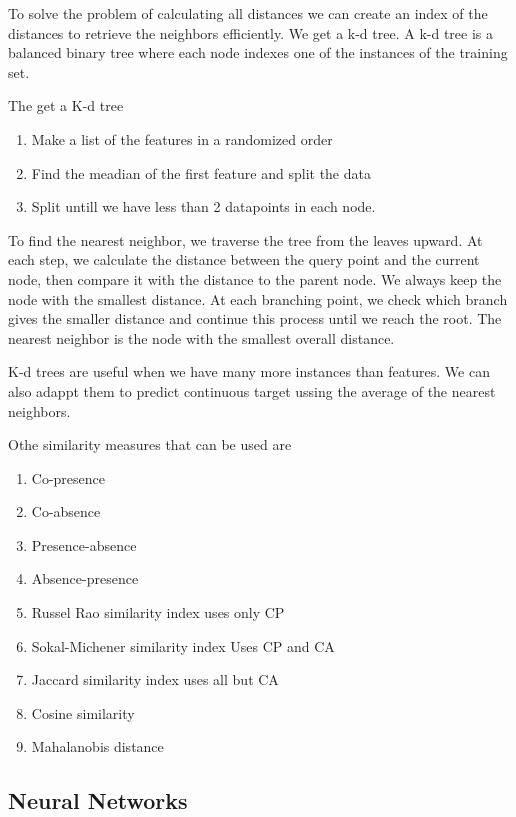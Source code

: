 \vspace{10pt}

To solve the problem of calculating all distances we can create an index of the distances to retrieve the neighbors efficiently. We get a k-d tree. A k-d tree is a balanced binary tree where each node indexes one of the instances of the training set.

The get a K-d tree

\begin{enumerate}
    \item Make a list of the features in a randomized order
    \item Find the meadian of the first feature and split the data
    \item Split untill we have less than 2 datapoints in each node.
\end{enumerate}

To find the nearest neighbor, we traverse the tree from the leaves upward.
At each step, we calculate the distance between the query point and the current node, then compare it with the distance to the parent node.
We always keep the node with the smallest distance.
At each branching point, we check which branch gives the smaller distance and continue this process until we reach the root.
The nearest neighbor is the node with the smallest overall distance.

K-d trees are useful when we have many more instances than features. We can also adappt them to predict continuous target ussing the average of the nearest neighbors.

Othe similarity measures that can be used are
\begin{enumerate}
    \item Co-presence
    \item Co-absence
    \item Presence-absence
    \item Absence-presence
    \item Russel Rao similarity index \ra uses only CP
    \item Sokal-Michener similarity index \ra Uses CP and CA
    \item Jaccard similarity index \ra uses all but CA
    \item Cosine similarity
    \item Mahalanobis distance
\end{enumerate}

\subsection{Neural Networks}

